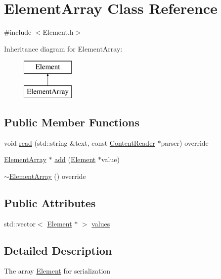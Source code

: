 \hypertarget{classElementArray}{}\section{Element\+Array Class Reference}
\label{classElementArray}


{\ttfamily \#include $<$Element.\+h$>$}

Inheritance diagram for Element\+Array\+:\begin{figure}[H]
\begin{center}
\leavevmode
\includegraphics[height=2.000000cm]{classElementArray}
\end{center}
\end{figure}
\subsection*{Public Member Functions}
\begin{DoxyCompactItemize}
\item 
void \mbox{\hyperlink{classElementArray_a5353c82d5c132acdad69858884e3e334}{read}} (std\+::string \&text, const \mbox{\hyperlink{classContentReader}{Content\+Reader}} $\ast$parser) override
\item 
\mbox{\hyperlink{classElementArray}{Element\+Array}} $\ast$ \mbox{\hyperlink{classElementArray_aff62f7af32e8440015b8dd297749b6c6}{add}} (\mbox{\hyperlink{classElement}{Element}} $\ast$value)
\item 
\mbox{\hyperlink{classElementArray_a30d544b599922612d29e48a0cc0e3305}{$\sim$\+Element\+Array}} () override
\end{DoxyCompactItemize}
\subsection*{Public Attributes}
\begin{DoxyCompactItemize}
\item 
std\+::vector$<$ \mbox{\hyperlink{classElement}{Element}} $\ast$ $>$ \mbox{\hyperlink{classElementArray_a3d0a8546daca882d59f55413a338be87}{values}}
\end{DoxyCompactItemize}


\subsection{Detailed Description}
The array \mbox{\hyperlink{classElement}{Element}} for serialization

